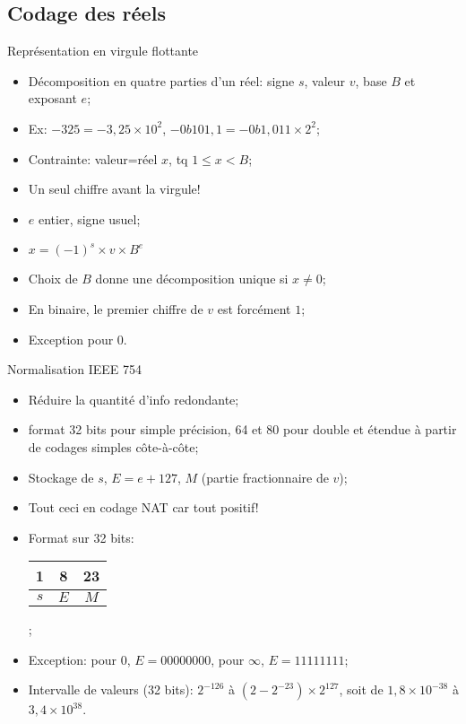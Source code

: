 \subsection{Codage des réels}
\begin{frame}{Représentation en virgule flottante}
  \begin{itemize}
  \item Décomposition en quatre parties d'un réel: signe $s$, valeur
    $v$, base $B$ et exposant $e$;
  \item Ex: $-325=-3,25\times10^2$, $-0b101,1=-0b1,011\times2^2$;
  \item Contrainte: valeur=réel $x$, tq $1\leq x<B$;
  \item Un seul chiffre avant la virgule!
  \item $e$ entier, signe usuel;
  \item $x=(-1)^s\times v\times B^e$
  \item Choix de $B$ donne une décomposition unique si $x\neq0$;
  \item En binaire, le premier chiffre de $v$ est forcément $1$;
  \item Exception pour $0$.
  \end{itemize}
\end{frame}
\begin{frame}{Normalisation IEEE 754}
  \begin{itemize}
  \item Réduire la quantité d'info redondante;
  \item format 32 bits pour simple précision, 64 et 80 pour double et
    étendue à partir de codages simples côte-à-côte;
  \item Stockage de $s$, $E=e+127$, $M$ (partie fractionnaire de $v$);
  \item Tout ceci en codage NAT car tout positif!
  \item Format sur 32 bits: \begin{tabular}{|c|c|c|}%
      \multicolumn{1}{c}{1}&\multicolumn{1}{c}{8}&\multicolumn{1}{c}{23}\\\hline%
      $s$&\quad$E$\quad&\qquad$M$\qquad\\\hline%
    \end{tabular};
  \item Exception: pour $0$, $E=00000000$, pour $\infty$, $E=11111111$;
  \item Intervalle de valeurs (32 bits): $2^{-126}$ à
    $(2-2^{-23})\times2^{127}$, soit de $1,8\times 10^{-38}$ à
    $3,4\times10^{38}$.
  \end{itemize}
\end{frame}

